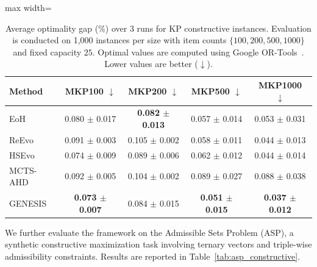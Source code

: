 \documentclass[sigconf,anonymous]{aamas}
\begin{document}
\begin{table}[!htbp]
\centering
\scriptsize
\setlength{\tabcolsep}{3pt}

\setlength{\tabcolsep}{6pt}
\caption{Average optimality gap (\%) over 3 runs for KP constructive instances. Evaluation is conducted on 1,000 instances per size with item counts $\{100,200,500,1000\}$ and fixed capacity $25$. Optimal values are computed using Google OR-Tools~\cite{ortools}. Lower values are better ($\downarrow$).}
\label{tab:kp_constructive}
\begin{adjustbox}{max width=\columnwidth}
\begin{tabular}{@{}lcccc@{}}
\toprule
Method 
& MKP100 $\downarrow$ 
& MKP200 $\downarrow$ 
& MKP500 $\downarrow$ 
& MKP1000 $\downarrow$ \\
\midrule
EoH & 0.080 $\pm$ 0.017 & \textbf{0.082 $\pm$ 0.013} & 0.057 $\pm$ 0.014 & 0.053 $\pm$ 0.031 \\
ReEvo    & 0.091 $\pm$ 0.003 & 0.105 $\pm$ 0.002 & 0.058 $\pm$ 0.011 & 0.044 $\pm$ 0.013 \\
HSEvo    & 0.074 $\pm$ 0.009 & 0.089 $\pm$ 0.006 & 0.062 $\pm$ 0.012 & 0.044 $\pm$ 0.014 \\
MCTS-AHD & 0.092 $\pm$ 0.005 & 0.104 $\pm$ 0.002 & 0.089 $\pm$ 0.027 & 0.088 $\pm$ 0.038 \\
GENESIS  & \textbf{0.073 $\pm$ 0.007} & 0.084 $\pm$ 0.015 & \textbf{0.051 $\pm$ 0.015} & \textbf{0.037 $\pm$ 0.012} \\
\bottomrule
\end{tabular}
\end{adjustbox}
\end{table}

We further evaluate the framework on the Admissible Sets Problem (ASP), a synthetic constructive maximization task involving ternary vectors and triple-wise admissibility constraints. Results are reported in Table~\ref{tab:asp_constructive}.
\end{document}
